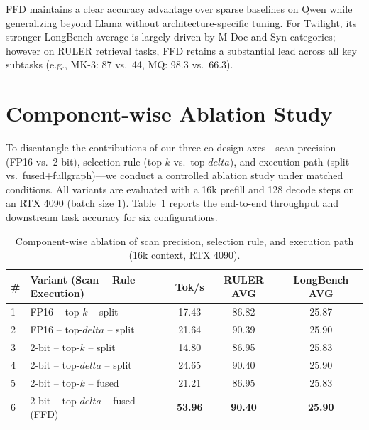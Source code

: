 \documentclass[]{mosi}
\def\delta{delta}%
\theoremstyle{plain}
\theoremstyle{definition}
\theoremstyle{remark}
\begin{document}
FFD maintains a clear accuracy advantage over sparse baselines on Qwen while generalizing beyond Llama without architecture-specific tuning. For Twilight, its stronger LongBench average is largely driven by M-Doc and Syn categories; however on RULER retrieval tasks, FFD retains a substantial lead across all key subtasks (e.g., MK-3: 87 vs.\ 44, MQ: 98.3 vs.\ 66.3).


\section{Component-wise Ablation Study}
\label{app:ablation}

To disentangle the contributions of our three co-design axes---scan precision (FP16 vs.\ 2-bit), selection rule (top-$k$ vs.\ top-$\delta$), and execution path (split vs.\ fused+fullgraph)---we conduct a controlled ablation study under matched conditions. All variants are evaluated with a 16k prefill and 128 decode steps on an RTX 4090 (batch size 1). Table~\ref{tab:ablation} reports the end-to-end throughput and downstream task accuracy for six configurations.

\begin{table}[h]
\caption{Component-wise ablation of scan precision, selection rule, and execution path (16k context, RTX 4090).}
\label{tab:ablation}
\begin{center}
\begin{small}
\begin{tabular}{llccc}
\toprule
\# & Variant (Scan -- Rule -- Execution) & Tok/s & RULER AVG & LongBench AVG \\
\midrule
1 & FP16 -- top-$k$ -- split        & 17.43 & 86.82 & 25.87 \\
2 & FP16 -- top-$\delta$ -- split    & 21.64 & 90.39 & 25.90 \\
3 & 2-bit -- top-$k$ -- split       & 14.80 & 86.95 & 25.83 \\
4 & 2-bit -- top-$\delta$ -- split   & 24.65 & 90.40 & 25.90 \\
5 & 2-bit -- top-$k$ -- fused       & 21.21 & 86.95 & 25.83 \\
6 & 2-bit -- top-$\delta$ -- fused (FFD) & \textbf{53.96} & \textbf{90.40} & \textbf{25.90} \\
\bottomrule
\end{tabular}
\end{small}
\end{center}
\end{table}
\end{document}
